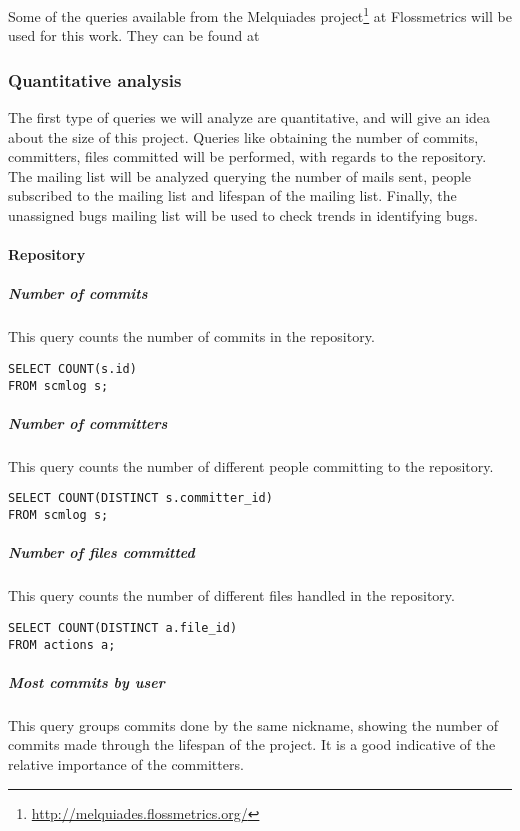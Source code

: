 Some of the queries available from the Melquiades project\footnote{\url{http://melquiades.flossmetrics.org/}} at Flossmetrics will be used for this work. They can be found at \cite{flossmetrics:queries} 


\subsubsection{Quantitative analysis}

The first type of queries we will analyze are quantitative, and will give an idea about the size of this project. Queries like obtaining the number of commits, committers, files committed will be performed, with regards to the repository. The mailing list will be analyzed querying the number of mails sent, people subscribed to the mailing list and lifespan of the mailing list. Finally, the unassigned bugs mailing list will be used to check trends in identifying bugs. 

\paragraph{Repository}

\subparagraph{Number of commits}

This query counts the number of commits in the repository.

\begin{verbatim}
SELECT COUNT(s.id)
FROM scmlog s;
\end{verbatim}

\subparagraph{Number of committers}

This query counts the number of different people committing to the repository.

\begin{verbatim}
SELECT COUNT(DISTINCT s.committer_id)
FROM scmlog s;
\end{verbatim}

\subparagraph{Number of files committed}

This query counts the number of different files handled in the repository.

\begin{verbatim}
SELECT COUNT(DISTINCT a.file_id)
FROM actions a;
\end{verbatim}

\subparagraph{Most commits by user}

This query groups commits done by the same nickname, showing the number of commits made through the lifespan of the project. It is a good indicative of the relative importance of the committers.

